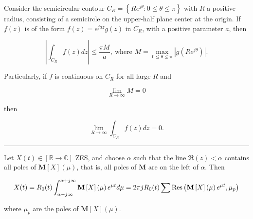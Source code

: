\begin{theorem}\label{theo:jordans_lemma} %
	Consider the semicircular contour $C_R = \left\{Re^{j\theta}: 0\leq \theta\leq \pi\right\}$ with $R$ a positive radius, consisting of a semicircle on the upper-half plane center at the origin. If $f(z)$ is of the form $f(z) = e^{jaz}g(z)$ in $C_R$, with a positive parameter $a$, then

\begin{equation} \left\lvert \int_{C_R} f(z)dz\right\rvert \leq \dfrac{\pi M}{a},\ \text{where } M = \max\limits_{0\leq\theta\leq\pi} \left\lvert g\left(Re^{j\theta}\right)\right\rvert .\end{equation}

	Particularly, if $f$ is continuous on $C_R$ for all large $R$ and 

\begin{equation} \lim_{R\to\infty} M = 0 \end{equation}

	\noindent then

\begin{equation} \lim_{R\to\infty} \int_{C_R} f(z)dz = 0 .\end{equation}

\end{theorem}\vspace{3mm}\hrule\vspace{3mm} %

\begin{theorem}\label{theo:xmu_reconst_residue} %
	Let $X(t)\in\left[\mathbb{R}\to\mathbb{C}\right]$ ZES, and choose $\alpha$ such that the line $\Re\left(z\right) < \alpha$ contains all poles of $\mathbf{M}\left[X\right]\left(\mu\right)$, that is, all poles of $\mathbf{M}$ are on the left of $\alpha$. Then

	\begin{equation} X(t) = R_0(t)\int_{\alpha - j\infty}^{\alpha + j\infty} \mathbf{M}\left[X\right]\left(\mu\right) e^{\mu t} d\mu = 2\pi jR_0(t) \sum \operatorname{Res}\left(\mathbf{M}\left[X\right]\left(\mu\right) e^{\mu t},\mu_p\right) \end{equation}

	\noindent where $\mu_p$ are the poles of $\mathbf{M}\left[X\right]\left(\mu\right)$.
\end{theorem}


